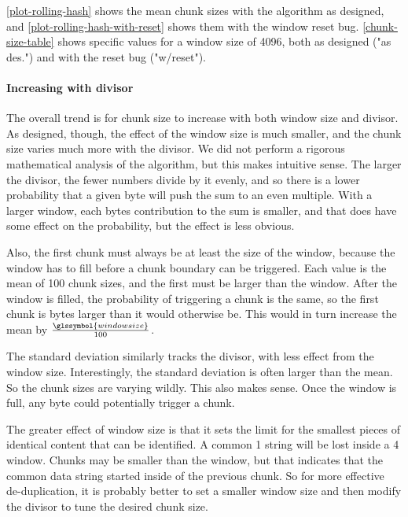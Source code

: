 \autoref{plot-rolling-hash} shows the mean chunk sizes with the algorithm as
designed, and \autoref{plot-rolling-hash-with-reset} shows them with the window
reset bug. \autoref{chunk-size-table} shows specific values for a window size of
4096, both as designed ("as des.") and with the reset bug ("w/reset").

\paragraph{Increasing with divisor}

The overall trend is for chunk size to increase with both window size and
divisor. As designed, though, the effect of the window size is much smaller, and
the chunk size varies much more with the divisor. We did not perform a rigorous
mathematical analysis of the algorithm, but this makes intuitive sense. The
larger the divisor, the fewer numbers divide by it evenly, and so there is a
lower probability that a given byte will push the sum to an even multiple. With
a larger window, each bytes contribution to the sum is smaller, and that does
have some effect on the probability, but the effect is less obvious.

Also, the first chunk must always be at least the size of the window, because
the window has to fill before a chunk boundary can be triggered. Each value is
the mean of 100 chunk sizes, and the first must be larger than the window. After
the window is filled, the probability of triggering a chunk is the same, so the
first chunk is  bytes larger than it would otherwise be.
This would in turn increase the mean by $\frac{\glssymbol{windowsize}}{100}$.

The standard deviation similarly tracks the divisor, with less effect from the
window size. Interestingly, the standard deviation is often larger than the
mean. So the chunk sizes are varying wildly. This also makes sense. Once the
window is full, any byte could potentially trigger a chunk.

The greater effect of window size is that it sets the limit for the smallest
pieces of identical content that can be identified. A common \SI{1}{\kib} string
will be lost inside a \SI{4}{\kib} window. Chunks may be smaller than the
window, but that indicates that the common data string started inside of the
previous chunk. So for more effective de-duplication, it is probably better to
set a smaller window size and then modify the divisor to tune the desired chunk
size.



